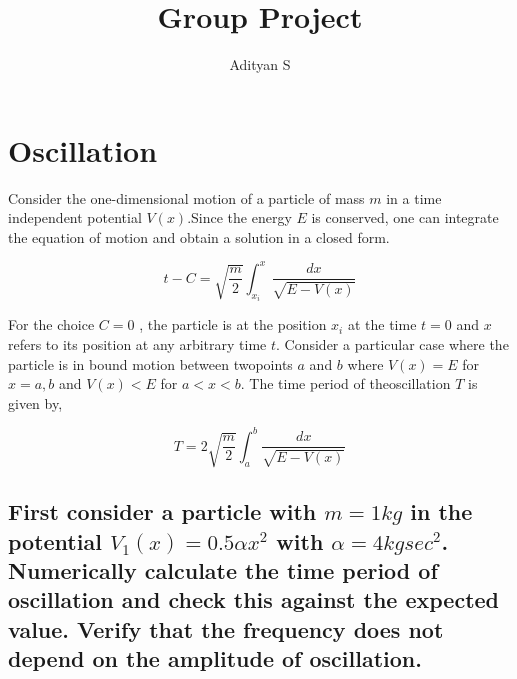 \documentclass[a4paper,11pt,twoside]{article}
\author{Adityan S}
\date{}
\title{Group Project}
\begin{document}
\maketitle
\tableofcontents

\clearpage

\section{Oscillation}
\label{sec:orgcc67047}
Consider the one-dimensional motion of a particle of mass \(m\) in a time independent potential \(V(x)\).Since the energy \(E\) is conserved, one can integrate the equation of motion and obtain a solution in a closed form.

$$
t-C = \sqrt{\frac{m}{2}}\int_{x_i}^x \frac{dx}{\sqrt{E-V(x)}}
$$

For the choice \(C=0\) , the particle is at the position \(x_i\) at the time \(t = 0\) and \(x\) refers to its position at any arbitrary time \(t\). Consider a particular case where the particle is in bound motion between twopoints \(a\) and \(b\) where \(V(x) = E\) for \(x = a, b\) and \(V(x) < E\) for \(a < x < b\). The time period of theoscillation \(T\) is given by,

$$
T = 2 \sqrt{\frac{m}{2}}\int_a^b \frac{dx}{\sqrt{E-V(x)}}
$$

\begin{center}
\end{center}

\subsection{First consider a particle with \(m = 1 kg\) in the potential \(V_1(x) = 0.5 \alpha x^2\) with \(\alpha =4 kg sec^2\). Numerically calculate the time period of oscillation and check this against the expected value. Verify that the frequency does not depend on the amplitude of oscillation.}
\label{sec:org85e2e80}
\end{document}
